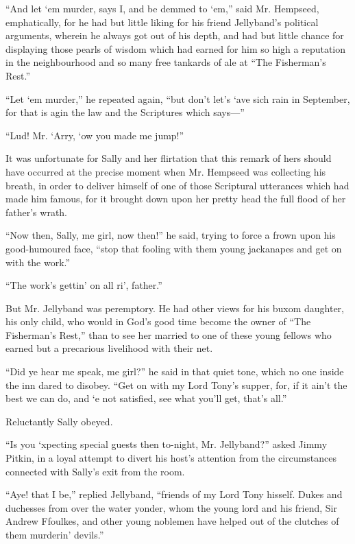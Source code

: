\documentclass[paper=a5,BCOR=7mm,twoside,DIV=calc,12pt,usegeometry,chapterprefix,endperiod,headings=big]{scrbook}
\begin{document}
\enquote{And let `em murder, says I, and be demmed to `em,} said Mr. Hempseed, emphatically, for he had but little liking for his friend Jellyband's political arguments, wherein he always got out of his depth, and had but little chance for displaying those pearls of wisdom which had earned for him so high a reputation in the neighbourhood and so many free tankards of ale at \enquote{The Fisherman's Rest.}

\enquote{Let `em murder,} he repeated again, \enquote{but don't let's `ave sich rain in September, for that is agin the law and the Scriptures which says---}

\enquote{Lud! Mr. `Arry, `ow you made me jump!}

It was unfortunate for Sally and her flirtation that this remark of hers should have occurred at the precise moment when Mr. Hempseed was collecting his breath, in order to deliver himself of one of those Scriptural utterances which had made him famous, for it brought down upon her pretty head the full flood of her father's wrath.

\enquote{Now then, Sally, me girl, now then!} he said, trying to force a frown upon his good-humoured face, \enquote{stop that fooling with them young jackanapes and get on with the work.}

\enquote{The work's gettin’ on all ri’, father.}

But Mr. Jellyband was peremptory. He had other views for his buxom daughter, his only child, who would in God's good time become the owner of \enquote{The Fisherman's Rest,} than to see her married to one of these young fellows who earned but a precarious livelihood with their net.

\enquote{Did ye hear me speak, me girl?} he said in that quiet tone, which no one inside the inn dared to disobey. \enquote{Get on with my Lord Tony's supper, for, if it ain't the best we can do, and `e not satisfied, see what you'll get, that's all.}

Reluctantly Sally obeyed.

\enquote{Is you `xpecting special guests then to-night, Mr. Jellyband?} asked Jimmy Pitkin, in a loyal attempt to divert his host's attention from the circumstances connected with Sally's exit from the room.

\enquote{Aye! that I be,} replied Jellyband, \enquote{friends of my Lord Tony hisself. Dukes and duchesses from over the water yonder, whom the young lord and his friend, Sir Andrew Ffoulkes, and other young noblemen have helped out of the clutches of them murderin’ devils.}
\end{document}
